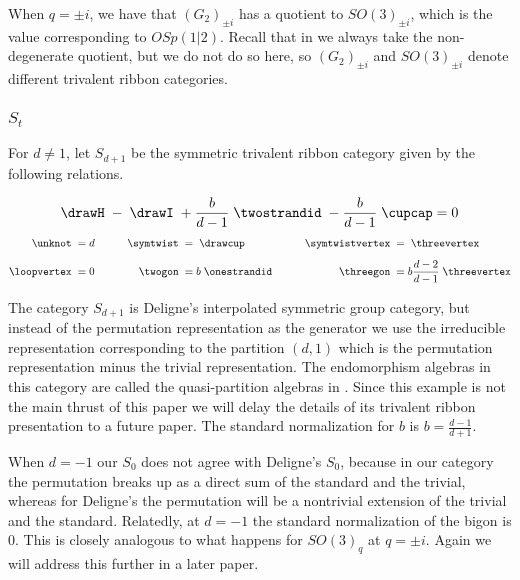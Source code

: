 \documentclass[12pt]{amsart}
\begin{document}
When $q = \pm i$, we have that $(G_2)_{\pm i}$ has a quotient to $SO(3)_{\pm i}$, which is the value corresponding to $OSp(1|2)$.  Recall that in \cite{MR3624901} we always take the non-degenerate quotient, but we do not do so here, so $(G_2)_{\pm i}$ and $SO(3)_{\pm i}$ denote different trivalent ribbon categories. 

\subsubsection{$S_t$}

\begin{definition}
For $d \neq 1$, let  $S_{d+1}$ be the symmetric trivalent ribbon category given by the following relations.

$$  \drawH \; - \; \drawI \; + \frac{b}{d-1}\; \twostrandid \; -  \frac{b}{d-1}\; \cupcap = 0$$
\begin{align*}
    \unknot\; &= d &\qquad
      \symtwist\; &=  \;\drawcup&\qquad
        \symtwistvertex\; &=  \;\threevertex\\[5pt]
    \loopvertex\;&=0&
      \twogon\;&= b\;\onestrandid&
        \threegon\; &= b \frac{d-2}{d-1}\;\threevertex
\end{align*}
\end{definition}

The category $S_{d+1}$ is Deligne's interpolated symmetric group category, but instead of the permutation representation as the generator we use the irreducible representation corresponding to the partition $(d,1)$ which is the permutation representation minus the trivial representation.  The endomorphism algebras in this category are called the quasi-partition algebras in \cite{MR3177889}.  Since this example is not the main thrust of this paper we will delay the details of its trivalent ribbon presentation to a future paper.  The standard normalization for $b$ is $b=\frac{d-1}{d+1}$.

\begin{warning}
When $d=-1$ our $S_0$ does not agree with Deligne's $S_0$, because in our category the permutation breaks up as a direct sum of the standard and the trivial, whereas for Deligne's the permutation will be a nontrivial extension of the trivial and the standard.  Relatedly, at $d=-1$ the standard normalization of the bigon is $0$.  This is closely analogous to what happens for $SO(3)_q$ at $q=\pm i$.  Again we will address this further in a later paper.
\end{warning}
\end{document}
